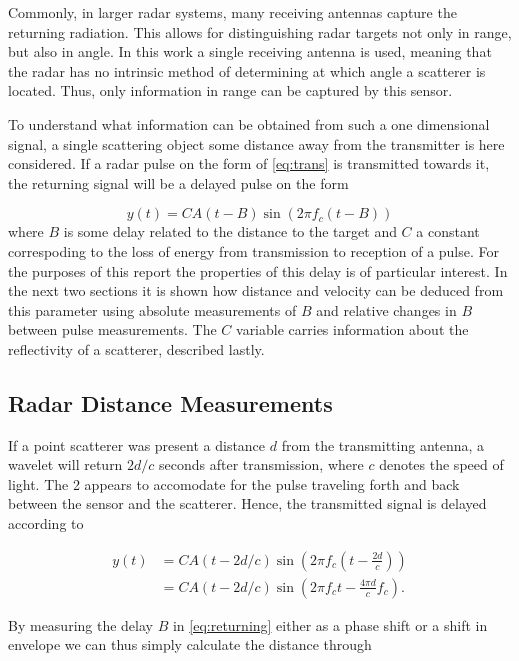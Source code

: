 Commonly, in larger radar systems, many receiving antennas capture the returning radiation. This allows for distinguishing radar targets not only in range, but also in angle. In this work a single receiving antenna is used, meaning that the radar has no intrinsic method of determining at which angle a scatterer is located. Thus, only information in range can be captured by this sensor.

To understand what information can be obtained from such a one dimensional signal, a single scattering object some distance away from the transmitter is here considered. If a radar pulse on the form of \eqref{eq:trans} is transmitted towards it, the returning signal will be a delayed pulse on the form \citep{richards_2014}

\begin{equation}\label{eq:returning}
	y(t) = CA(t-B)\sin(2\pi f_c (t-B))
\end{equation}
where $B$ is some delay related to the distance to the target and $C$ a constant correspoding to the loss of energy from transmission to reception of a pulse. For the purposes of this report the properties of this delay is of particular interest. In the next two sections it is shown how distance and velocity can be deduced from this parameter using absolute measurements of $B$ and relative changes in $B$ between pulse measurements. The $C$ variable carries information about the reflectivity of a scatterer, described lastly. 

\subsection{Radar Distance Measurements}

If a point scatterer was present a distance $d$ from the transmitting antenna, a wavelet will return $2d/c$ seconds after transmission, where $c$ denotes the speed of light. The 2 appears to accomodate for the pulse traveling forth and back between the sensor and the scatterer. Hence, the transmitted signal is delayed according to 

\begin{equation}
	\begin{split}
		y(t) 
		& = CA(t-2d/c)\sin(2\pi f_c(t - \frac{2d}{c})) \\
		& = CA(t-2d/c)\sin(2\pi f_ct - \frac{4\pi d}{c}f_c).
	\end{split}
\end{equation}

By measuring the delay $B$ in \eqref{eq:returning} either as a phase shift or a shift in envelope we can thus simply calculate the distance through

